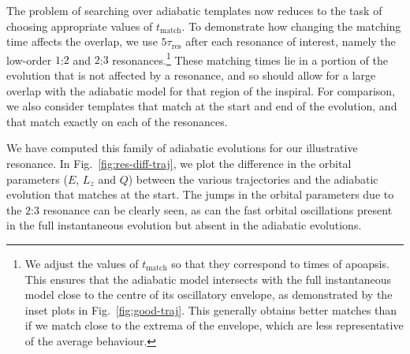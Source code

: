 \documentclass[aps,prd,amsfonts,amssymb,amsmath,nofootinbib,showpacs,superscriptaddress,twocolumn,floatfix]{revtex4-1}
\newcommand{\figref}[1]{Fig.~\ref{fig:#1}}
\newcommand{\sub}[1]{\ensuremath{_\mathrm{#1}}}
\begin{document}

The problem of searching over adiabatic templates now reduces to the task of choosing appropriate values of $t\sub{match}$. To demonstrate how changing the matching time affects the overlap, we use $5\tau\sub{res}$ after each resonance of interest, namely the low-order $1$:$2$ and $2$:$3$ resonances.\footnote{We adjust the values of $t\sub{match}$ so that they correspond to times of apoapsis. This ensures that the adiabatic model intersects with the full instantaneous model close to the centre of its oscillatory envelope, as demonstrated by the inset plots in \figref{good-traj}. This generally obtains better matches than if we match close to the extrema of the envelope, which are less representative of the average behaviour.} These matching times lie in a portion of the evolution that is not affected by a resonance, and so should allow for a large overlap with the adiabatic model for that region of the inspiral. For comparison, we also consider templates that match at the start and end of the evolution, and that match exactly on each of the resonances.


We have computed this family of adiabatic evolutions for our illustrative resonance. In \figref{res-diff-traj}, we plot the difference in the orbital parameters ($E$, $L_z$ and $Q$) between the various trajectories and the adiabatic evolution that matches at the start. The jumps in the orbital parameters due to the $2$:$3$ resonance can be clearly seen, as can the fast orbital oscillations present in the full instantaneous evolution but absent in the adiabatic evolutions.
\end{document}
